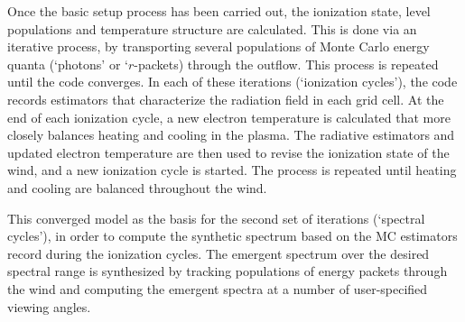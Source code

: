 Once the basic setup process has been carried out, the ionization state,
level populations and temperature structure are calculated.
This is done via an iterative process, by transporting several populations of 
Monte Carlo energy quanta (`photons' or `$r$-packets) through the outflow.
This process is repeated until the code converges. 
In each of these iterations (`ionization cycles'), the code records estimators that 
characterize the radiation field in each grid cell. At the end 
of each ionization cycle, a new electron temperature is calculated
that more closely balances heating and cooling in the 
plasma. The radiative estimators and updated electron
temperature are then used to revise the ionization state of the wind,
and a new ionization cycle is started. The process is repeated until
heating and cooling are balanced throughout the wind. 

This converged model as the basis for the second set of
iterations (`spectral cycles'), in order to compute the synthetic spectrum based on the 
MC estimators record during the ionization cycles. 
The emergent spectrum over the desired spectral range is synthesized by 
tracking populations of energy packets through the wind and computing the emergent spectra at
a number of user-specified viewing angles.  

